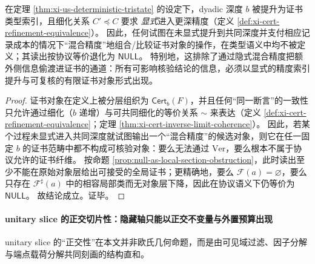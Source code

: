 \begin{corollary}\label{cor:xi-precision-type-no-leakage}
在定理 \ref{thm:xi-us-deterministic-tristate} 的设定下，dyadic 深度 \(b\) 被提升为证书类型索引，且细化关系 \(C'\preceq C\) 要求 \emph{显式}进入更深精度（定义 \ref{def:xi-cert-refinement-equivalence}）。
因此，任何试图在未显式提升到共同深度并支付相应记录成本的情况下“混合精度”地组合/比较证书对象的操作，在类型语义中均不被定义；其读出按协议等价退化为 \(\mathsf{NULL}\)。
特别地，这排除了通过隐式混合精度把额外侧信息偷渡进证书的通道：所有可影响核验结论的信息，必须以显式的精度索引提升与可复核的有限证书对象形式出现。
\end{corollary}

\begin{proof}
证书对象在定义上被分层组织为 \(\mathsf{Cert}_b(F)\)，并且任何“同一断言”的一致性只允许通过细化（\(b\) 递增）与可共同细化的等价关系 \(\sim\) 来表达（定义 \ref{def:xi-cert-refinement-equivalence}；定理 \ref{thm:xi-cert-inverse-limit-coherence}）。
因此，若某个过程未显式进入共同深度就试图输出一个“混合精度”的候选对象，则它在任一固定 \(b\) 的证书范畴中都不构成可核验对象：要么无法通过 \(\mathrm{Ver}\)，要么根本不属于协议允许的证书纤维。
按命题 \ref{prop:null-as-local-section-obstruction}，此时读出至少不能在原始对象层给出可接受的全局证书；更精确地，要么 \(\mathscr F(a)=\varnothing\)，要么只存在 \(\mathscr F^\sharp(a)\) 中的相容局部类而无对象层下降，因此在协议语义下仍等价为 \(\mathsf{NULL}\)。
故结论成立。证毕。
\end{proof}

\paragraph{unitary slice 的正交切片性：隐藏轴只能以正交不变量与外置预算出现}
unitary slice 的“正交性”在本文并非欧氏几何命题，而是由可见域过滤、因子分解与端点载荷分解共同刻画的结构直和。

